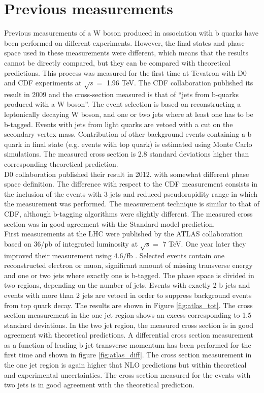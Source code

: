 \section{Previous measurements}
\label{sec:2.3}
	\par Previous measurements of a W boson produced in association with b quarks have been performed on different experiments. However, the final states and phase space used in these measurements were different, which means that the results cannot be directly compared, but they can be compared with theoretical predictions. This process was measured for the first time at Tevatron with D0 and CDF experiments at $\sqrt{s} =$ 1.96 TeV. The CDF collaboration published its result in 2009 and the cross-section measured is that of “jets from b-quarks produced with a W boson”\citep{Aaltonen:2009qi}. The event selection is based on reconstructing a leptonically decaying W boson, and one or two jets where at least one has to be b-tagged. Events with jets from light quarks are vetoed with a cut on the secondary vertex mass. Contribution of other background events containing a b quark in final state (e.g. events with top quark) is estimated using Monte Carlo simulations. The measured cross section is 2.8 standard deviations higher than corresponding theoretical prediction. \\
	D0 collaboration published their result in 2012. with somewhat different phase space definition\citep{D0:2012qt}. The difference with respect to the CDF measurement consists in the inclusion of the events with 3 jets and reduced pseudorapidity range in which the measurement was performed. The measurement technique is similar to that of CDF, although b-tagging algorithms were slightly different. The measured cross section was in good agreement with the Standard model prediction.\\
	First measurements at the LHC were published by the ATLAS collaboration based on 36/pb of integrated luminosity at $\sqrt{s} =$ 7 TeV. One year later they improved their measurement using $4.6/$fb \cite{Aad:2013vka}. Selected events contain one reconstructed electron or muon, significant amount of missing transverse energy and one or two jets where exactly one is b-tagged. The phase space is divided in two regions, depending on the number of jets. Events with exactly 2 b jets and events with more than 2 jets are vetoed in order to suppress background events from top quark decay. The results are shown in Figure \ref{fig:atlas_tot}. The cross section measurement in the one jet region shows an excess corresponding to 1.5 standard deviations. In the two jet region, the measured cross section is in good agreement with theoretical predictions. A differential cross section measurement as a function of leading b jet transverse momentum has been performed for the first time and shown in figure \ref{fig:atlas_diff}. The cross section measurement in the one jet region is again higher that NLO predictions but within theoretical and experimental uncertainties. The cross section measured for the events with two jets is in good agreement with the theoretical prediction.
